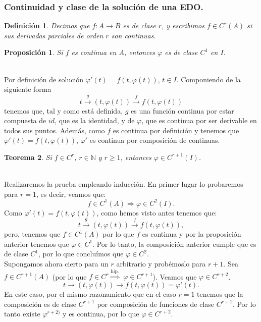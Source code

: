 \documentclass[11pt]{article}
\makeatletter
\theoremstyle{theorem-style}  %
\newtheorem{theorem}{Teorema}[section]  %
\newtheorem{proposition}[theorem]{Proposición}
\renewenvironment{proof}[1][\proofname]{\par
	\pushQED{\qed}%
	\normalfont \topsep6\p@\@plus6\p@\relax
	\list{}{%
		\settowidth{\leftmargin}{\quad:\hskip\labelsep}%
		\setlength{\labelwidth}{0pt}%
		\setlength{\itemindent}{-\leftmargin}%
	}%
	\item[\hskip\labelsep\itshape#1\@addpunct{:}]\ignorespaces
}{%
	\popQED\endlist\@endpefalse
}
\theoremstyle{definition-style}
\newtheorem{definition}{Definición}[section]
\theoremstyle{example-style}
\makeatother
\begin{document}
\subsubsection{Continuidad y clase de la solución de una EDO.}
\begin{definition}
	Decimos que $ f:A\longrightarrow B $ es de clase $ r $, y escribimos $ f\in C^r(A) $ si sus derivadas parciales de orden $ r $ son continuas.
\end{definition}
\begin{proposition}
	Si $f$ es continua en $A$, entonces $\varphi$ es de clase $C^1$ en $I$.
\end{proposition}
\begin{proof} \ \\
	Por definición de solución $\varphi' (t) = f(t, \varphi (t))$, $t \in I$. Componiendo de la siguiente forma
	\[t \stackrel{g}{\longrightarrow} (t, \varphi (t)) \stackrel{f}{\longrightarrow} f(t, \varphi (t))\]
	tenemos que, tal y como está definida, $g$ es una función continua por estar compuesta de $id$, que es la identidad, y de $\varphi$, que es continua por ser derivable en todos sus puntos. Además, como $f$ es continua por definición y tenemos que $\varphi' (t) = f(t, \varphi (t))$, $\varphi'$ es continua por composición de continuas.
\end{proof}
\begin{theorem}
	Si $f \in C^r$, $r \in \mathbb{N}$ y $r \geq 1$, entonces $\varphi \in C^{r+1}(I)$.
\end{theorem}
\begin{proof}\ \\
	Realizaremos la prueba empleando inducción. En primer lugar lo probaremos para $r=1$, es decir, veamos que:
	\[f\in C^1(A) \Rightarrow \varphi \in C^2(I).\]
	Como $\varphi' (t) = f(t, \varphi (t))$, como hemos visto antes tenemos que:
		\[t \stackrel{g}{\longrightarrow} (t, \varphi (t)) \stackrel{f}{\longrightarrow} f(t, \varphi (t)),\]
	pero, tenemos que $f \in C^1(A)$ por lo que $f$ es continua y por la proposición anterior tenemos que $\varphi \in C^1$. Por lo tanto, la composición anterior cumple que es de clase $C^1$, por lo que concluímos que $\varphi \in C^2$. \\
	Supongamos ahora cierto para un $r$ arbitrario y probémoslo para $r+1$. Sea $f \in C^{r+1} (A)$ (por lo que $f \in C^r \stackrel{\text{hip.}}{\Rightarrow}$ $\varphi \in C^{r+1}$). Veamos que $\varphi \in C^{r+2}$.
	\[t \longrightarrow (t, \varphi (t)) \longrightarrow f(t, \varphi (t)) = \varphi' (t).\]
	En este caso, por el mismo razonamiento que en el caso $r=1$ tenemos que la composición es de clase $C^{r+1}$ por composición de funciones de clase $C^{r+1}$. Por lo tanto existe $\varphi^{r+2)}$ y es continua, por lo que $\varphi \in C^{r+2}$. 
\end{proof}
\end{document}

